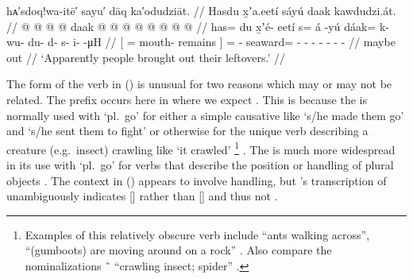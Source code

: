 \ex\label{ex:92-19-brought-them-leftovers}%
%
\begingl
	\glpreamble	hᴀ′sdoq!wa-itē′ sayu′ dāq ka′odudziāt. //
	\glpreamble	Hasdu x̱ʼa.eetí sáyú daak kawdudzi.át. //
	\gla	{}  @ {}  @ {} {}
		 @ {} @ {}
		daak @  @ {} @ {} @ {} @ {} @ {} @ {} @ {} //
	\glb	{} has= du x̱ʼé- eetí {}
		s= á -yú
		dáak= k- wu- du- d- s- i-  -μH //
	\glc	{}[ =  mouth- remains {}]
		=  -
		seaward= - - - - - -
			 - //
	\gld	{}  {}  {} {}
		maybe\·  {}
		out  {} {} {} {} {} {} {} //
	\glft	‘Apparently people brought out their leftovers.’
		//
\endgl
\xe

The form of the verb in (\lastx) is unusual for two reasons which may or may not be related.
The  prefix occurs here in  where we expect .
This is because the  is normally used with  ‘pl.\ go’ for either a simple causative like  ‘s/he made them go’ and  ‘s/he sent them to fight’ or otherwise for the unique verb describing a creature (e.g.\ insect) crawling like  ‘it crawled’%
\footnote{Examples of this relatively obscure verb include
 “ants walking across”,
 “(gumboots) are moving around on a rock” \parencite[02/78]{leer:1973}.
Also compare the nominalizations
 \~\  “crawling insect; spider” \parencite[02/78]{leer:1973}.}
\parencite[92]{leer:1976}.
The  is much more widespread in its use with  ‘pl.\ go’ for verbs that describe the position or handling of plural objects \parencites[02/79–95]{leer:1973}[92–96]{leer:1976}.
The context in (\lastx) appears to involve handling, but \citeauthor{swanton:1909}’s transcription of  unambiguously indicates  [] rather than  [] and thus  not .

